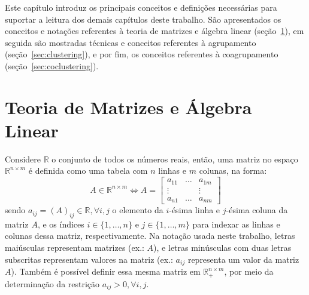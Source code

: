 \documentclass[
    12pt,                %
    oneside,            %
    a4paper,            %
    english,            %
    brazil                %
    ]{abntex2ppgsi}
\begin{document}
Este capítulo introduz os principais conceitos e definições necessárias para suportar a leitura dos demais capítulos deste trabalho.
São apresentados os conceitos e notações referentes à teoria de matrizes e álgebra linear (seção~\ref{sec:matrix-alglin}), em seguida são mostradas técnicas e conceitos referentes à agrupamento (seção~\ref{sec:clustering}), e por fim, os conceitos referentes à coagrupamento (seção~\ref{sec:coclustering}).

\section{Teoria de Matrizes e Álgebra Linear}
\label{sec:matrix-alglin}

Considere $\mathbb{R}$ o conjunto de todos os números reais, então, uma matriz no espaço $\mathbb{R}^{n \times m}$ é definida como uma tabela com $n$ linhas e $m$ colunas, na forma:
\[
    A \in \mathbb{R}^{n \times m} \Leftrightarrow A = \begin{bmatrix}
                                                                     a_{1 1} & \hdots & a_{1 m} \\
                                                                     \vdots  &        & \vdots  \\
                                                                     a_{n 1} & \hdots & a_{n m}
                                                                 \end{bmatrix}
\]
sendo $a_{i j} = (A)_{ij} \in \mathbb{R}, \forall i, j$ o elemento da $i$-ésima linha e $j$-ésima coluna da matriz $A$, e os índices $i \in \{1, \dots, n\}$ e $j \in \{1, \dots, m\}$ para indexar as linhas e colunas dessa matriz, respectivamente.
Na notação usada neste trabalho, letras maiúsculas representam matrizes (ex.: $A$), e letras minúsculas com duas letras subscritas representam valores na matriz (ex.: $a_{ij}$ representa um valor da matriz $A$).
Também é possível definir essa mesma matriz em $\mathbb{R}^{n \times m}_{+}$, por meio da determinação da restrição $a_{ij} > 0, \forall i,j$.
\end{document}
